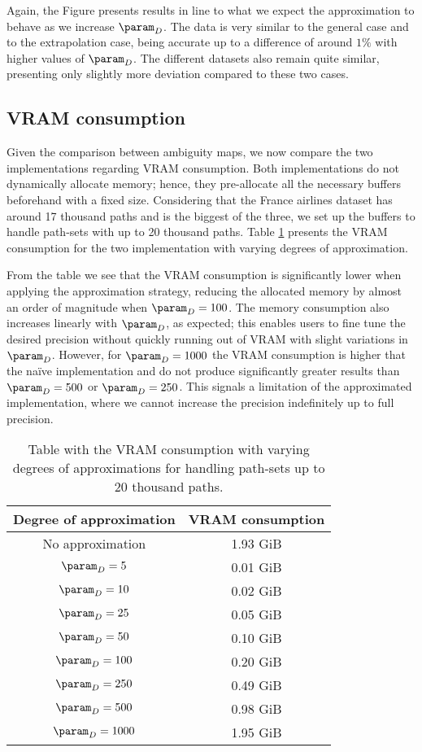 Again, the Figure presents results in line to what we expect the approximation to behave as we increase $\param_D$. The data is very similar to the general case and to the extrapolation case, being accurate up to a difference of around $1\%$ with higher values of $\param_D$. The different datasets also remain quite similar, presenting only slightly more deviation compared to these two cases.

\subsection{VRAM consumption}

Given the comparison between ambiguity maps, we now compare the two implementations regarding VRAM consumption. Both implementations do not dynamically allocate memory; hence, they pre-allocate all the necessary buffers beforehand with a fixed size. Considering that the France airlines dataset has around 17 thousand paths and is the biggest of the three, we set up the buffers to handle path-sets with up to 20 thousand paths. Table \ref{tab:vram} presents the VRAM consumption for the two implementation with varying degrees of approximation.

From the table we see that the VRAM consumption is significantly lower when applying the approximation strategy, reducing the allocated memory by almost an order of magnitude when $\param_D = 100$. The memory consumption also increases linearly with $\param_D$, as expected; this enables users to fine tune the desired precision without quickly running out of VRAM with slight variations in $\param_D$. However, for $\param_D = 1000$ the VRAM consumption is higher that the na\"ive implementation and do not produce significantly greater results than $\param_D = 500$ or $\param_D = 250$. This signals a limitation of the approximated implementation, where we cannot increase the precision indefinitely up to full precision.

\begin{table}
\centering
\renewcommand{\arraystretch}{1.5}
\begin{tabular}{|c|c|}
\hline
Degree of approximation & VRAM consumption \\
\hline
\hline
No approximation  & 1.93 GiB \\
\hline
$\param_D = 5$    & 0.01 GiB \\
\hline
$\param_D = 10$   & 0.02 GiB \\
\hline
$\param_D = 25$   & 0.05 GiB \\
\hline
$\param_D = 50$   & 0.10 GiB \\
\hline
$\param_D = 100$  & 0.20 GiB \\
\hline
$\param_D = 250$  & 0.49 GiB \\
\hline
$\param_D = 500$  & 0.98 GiB \\
\hline
$\param_D = 1000$ & 1.95 GiB \\
\hline
\end{tabular}
\caption{Table with the VRAM consumption with varying degrees of approximations for handling path-sets up to 20 thousand paths.}
\label{tab:vram}
\end{table}

